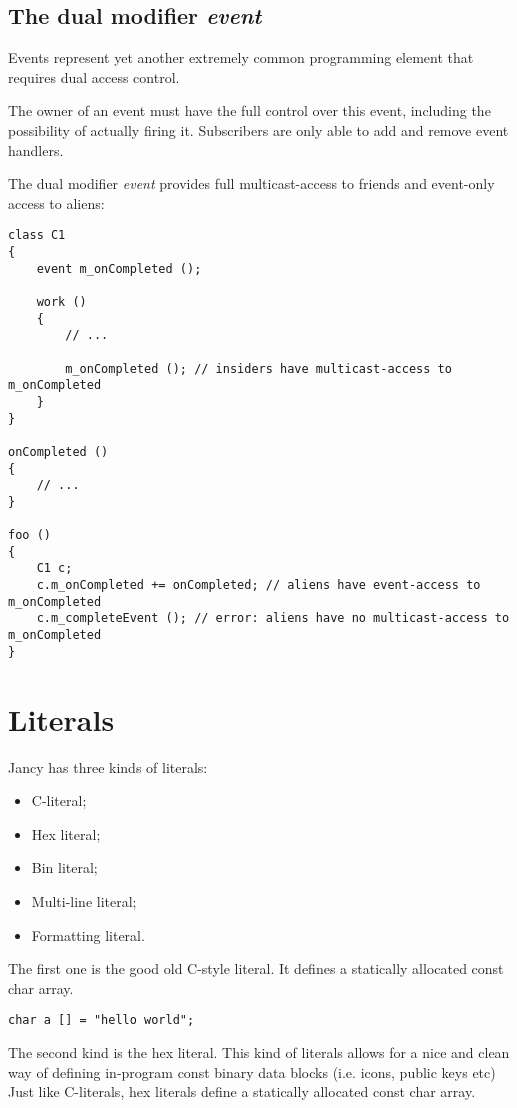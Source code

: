 \documentclass[oneside]{book}
\begin{document}
\subsection{The dual modifier \emph{event}}
Events represent yet another extremely common programming element that requires dual access control.

The owner of an event must have the full control over this event, including the possibility of actually firing it. Subscribers are only able to add and remove event handlers.

The dual modifier \emph{event} provides full multicast-access to friends and event-only access to aliens:

\begin{lstlisting}
class C1
{
    event m_onCompleted ();

    work ()
    {
        // ...

        m_onCompleted (); // insiders have multicast-access to m_onCompleted
    }
}

onCompleted ()
{
    // ...
}

foo ()
{
    C1 c;
    c.m_onCompleted += onCompleted; // aliens have event-access to m_onCompleted
    c.m_completeEvent (); // error: aliens have no multicast-access to m_onCompleted
}
\end{lstlisting}

\section{Literals}
Jancy has three kinds of literals:

\begin{itemize}
\item C-literal;
\item Hex literal;
\item Bin literal;
\item Multi-line literal;
\item Formatting literal.
\end{itemize}

The first one is the good old C-style literal. It defines a statically allocated const char array.

\begin{lstlisting}
char a [] = "hello world";
\end{lstlisting}

The second kind is the hex literal. This kind of literals allows for a nice and clean way of defining in-program const binary data blocks (i.e. icons, public keys etc) Just like C-literals, hex literals define a statically allocated const char array.
\end{document}
